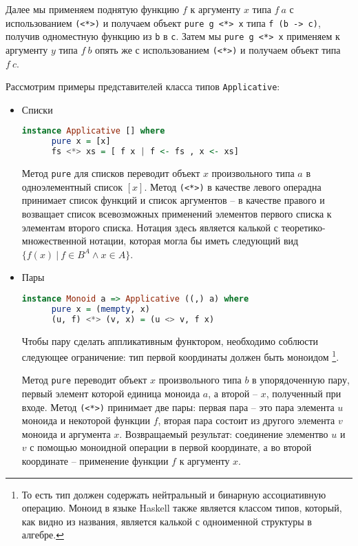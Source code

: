 Далее мы применяем поднятую функцию $f$ к аргументу $x$ типа $f \: a$ с использованием \verb"(<*>)"
и получаем объект \verb"pure g <*> x" типа \verb"f (b -> c)", получив одноместную функцию из \verb"b" в \verb"c".
Затем мы \verb"pure g <*> x" применяем к аргументу $y$ типа $f \: b$ опять же с использованием
\verb"(<*>)" и получаем объект типа $f \: c$.

Рассмотрим примеры представителей класса типов \verb"Applicative":

\begin{itemize}
  \item Списки
  \begin{lstlisting}[language=Haskell]
    instance Applicative [] where
      pure x = [x]
      fs <*> xs = [ f x | f <- fs , x <- xs]
  \end{lstlisting}

  Метод \verb"pure" для списков переводит объект $x$ произвольного типа $a$ в
  одноэлементный список $[x]$. Метод \verb"(<*>)" в качестве левого операдна
  принимает список функций и список аргументов -- в качестве правого и возващает
  список всевозможных применений элементов первого списка к элементам второго списка.
  Нотация здесь является калькой с теоретико-множественной нотации, которая могла бы иметь
  следующий вид $\{ f(x) \: | \: f \in B^A \land x \in A \}$.
  \item Пары
  \begin{lstlisting}[language=Haskell]
  instance Monoid a => Applicative ((,) a) where
      pure x = (mempty, x)
      (u, f) <*> (v, x) = (u <> v, f x)
  \end{lstlisting}

  Чтобы пару сделать аппликативным функтором, необходимо соблюсти следующее ограничение:
  тип первой координаты должен быть моноидом \footnote{То есть тип должен содержать нейтральный и бинарную ассоциативную операцию.
  Моноид в языке Haskell также является классом типов, который, как видно из названия, является калькой с одноименной структуры в алгебре.}.

  Метод \verb"pure" переводит объект $x$ произвольного типа $b$ в упорядоченную пару, первый элемент которой единица моноида $a$,
  а второй -- $x$, полученный при входе. Метод \verb"(<*>)" принимает две пары: первая пара -- это пара элемента $u$ моноида и некоторой функции $f$,
  вторая пара состоит из другого элемента $v$ моноида и аргумента $x$. Возвращаемый результат:
  соединение элементво $u$ и $v$ с помощью моноидной операции в первой координате, а во второй координате -- применение функции $f$ к аргументу $x$.


\end{itemize}
